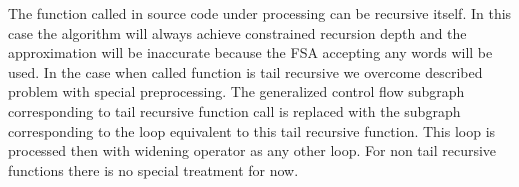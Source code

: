 The function called in source code under processing can be recursive itself. In this case the algorithm will always achieve constrained recursion depth and the approximation will be inaccurate because the FSA accepting any words will be used. In the case when called function is tail recursive we overcome described problem with special preprocessing. The generalized control flow subgraph  corresponding to tail recursive function call is replaced with the subgraph corresponding to the loop equivalent to this tail recursive function. This loop is processed then with widening operator as any other loop. For non tail recursive functions there is no special treatment for now.